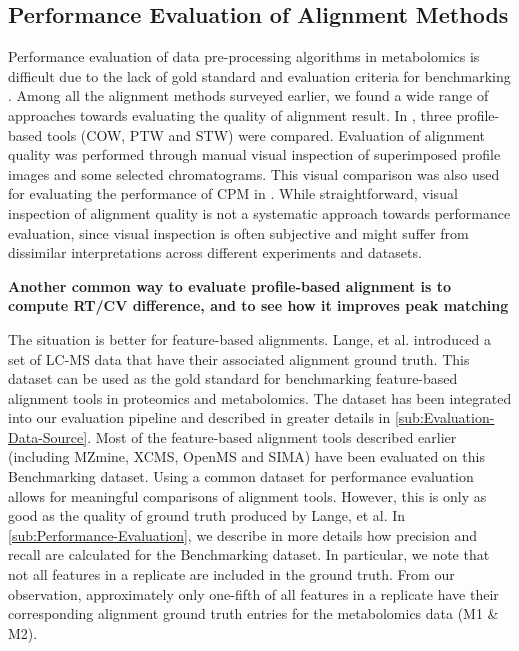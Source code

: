\subsection{Performance Evaluation of Alignment Methods}

Performance evaluation of data pre-processing algorithms in metabolomics is difficult due to the lack of gold standard and evaluation criteria for benchmarking \cite{Castillo2011}. Among all the alignment methods surveyed earlier, we found a wide range of approaches towards evaluating the quality of alignment result. In \cite{VanNederkassel2006}, three profile-based tools (COW, PTW and STW) were compared. Evaluation of alignment quality was performed through manual visual inspection of superimposed profile images and some selected chromatograms. This visual comparison was also used for evaluating the performance of CPM in \cite{Listgarten2005}. While straightforward, visual inspection of alignment quality is not a systematic approach towards performance evaluation, since visual inspection is often subjective and might suffer from dissimilar interpretations across different experiments and datasets.

\textbf{Another common way to evaluate profile-based alignment is
to compute RT/CV difference, and to see how it improves peak matching
\cite{Tsai2013a}}

The situation is better for feature-based alignments. Lange, et al. \cite{Lange2008} introduced a set of LC-MS data that have their associated alignment ground truth. This dataset can be used as the gold standard for benchmarking feature-based alignment tools in proteomics and metabolomics. The dataset has been integrated into our evaluation pipeline and described in greater details in \ref{sub:Evaluation-Data-Source}. Most of the feature-based alignment tools described earlier (including MZmine, XCMS, OpenMS and SIMA) have been evaluated on this Benchmarking dataset. Using a common dataset for performance evaluation allows for meaningful comparisons of alignment tools. However, this is only as good as the quality of ground truth produced by Lange, et al. In \ref{sub:Performance-Evaluation}, we describe in more details how precision and recall are calculated for the Benchmarking dataset. In particular, we note that not all features in a replicate are included in the ground truth. From our observation, approximately only one-fifth of all features in a replicate have their corresponding alignment ground truth entries for the metabolomics data (M1 \& M2).

